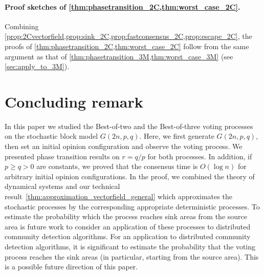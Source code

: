 \documentclass[letterpaper,11pt]{article}
\begin{document}
\paragraph*{Proof sketches of \cref{thm:phasetransition_2C,thm:worst_case_2C}.}
Combining \cref{prop:2Cvectorfield,prop:sink_2C,prop:fastconsensus_2C,prop:escape_2C}, the proofs of \cref{thm:phasetransition_2C,thm:worst_case_2C} follow from the same argument as that of \cref{thm:phasetransition_3M,thm:worst_case_3M} (see \cref{sec:apply_to_3M}).


\section{Concluding remark} \label{sec:concluding}
In this paper we studied the Best-of-two and the Best-of-three voting processes on the stochastic block model $G(2n,p,q)$.
Here, we first generate $G(2n,p,q)$, then set an initial opinion configuration and observe the voting process.
We presented phase transition results on $r=q/p$ for both processes. 
In addition, if $p\geq q>0$ are constants, we proved that the consensus time is $O(\log n)$ for arbitrary initial opinion configurations.
In the proof, we combined the theory of dynamical systems and our technical result~\cref{thm:approximation_vectorfield_general} which approximates the stochastic processes by the corresponding appropriate deterministic processes.
To estimate the probability which the process reaches sink areas from the source area is future work to consider an application of these processes to distributed community detection algorithms.
For an application to distributed community detection algorithms, it is significant to estimate the probability that the voting process reaches the sink areas (in particular, starting from the source area).
This is a possible future direction of this paper.
\end{document}
